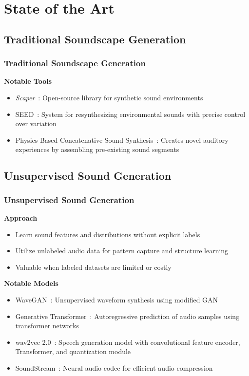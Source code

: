 \section{State of the Art}

\subsection{Traditional Soundscape Generation}

\begin{frame}
    \frametitle{Traditional Soundscape Generation}

    \textbf{Notable Tools}
    \begin{itemize}
        \item \textit{Scaper}~\cite{salamon_scaper_2017}: Open-source library for synthetic sound environments
        \item SEED~\cite{bernardes_seed_2016}: System for resynthesizing environmental sounds with precise control over variation
        \item Physics-Based Concatenative Sound Synthesis~\cite{magalhaes_physics-based_2020}: Creates novel auditory experiences by assembling pre-existing sound segments
    \end{itemize}
\end{frame}

\subsection{Unsupervised Sound Generation}

\begin{frame}
    \frametitle{Unsupervised Sound Generation}

    \textbf{Approach}
    \begin{itemize}
        \item Learn sound features and distributions without explicit labels
        \item Utilize unlabeled audio data for pattern capture and structure learning
        \item Valuable when labeled datasets are limited or costly
    \end{itemize}

    \textbf{Notable Models}
    \begin{itemize}
        \item WaveGAN~\cite{donahue_adversarial_2019}: Unsupervised waveform synthesis using modified GAN
        \item Generative Transformer~\cite{verma_generative_2021}: Autoregressive prediction of audio samples using transformer networks
        \item wav2vec 2.0~\cite{baevski_wav2vec_2020}: Speech generation model with convolutional feature encoder, Transformer, and quantization module
        \item SoundStream~\cite{zeghidour_soundstream_2021}: Neural audio codec for efficient audio compression
    \end{itemize}
\end{frame}


